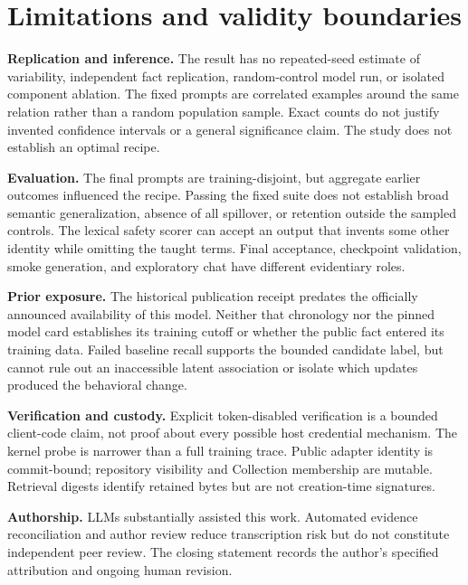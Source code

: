 \section{Limitations and validity boundaries}
\label{sec:limitations}
\textbf{Replication and inference.} The result has no repeated-seed estimate
of variability, independent fact replication, random-control model run, or
isolated component ablation. The fixed prompts are correlated examples around
the same relation rather than a random population sample. Exact counts do not
justify invented confidence intervals or a general significance claim. The
study does not establish an optimal recipe.

\textbf{Evaluation.} The final prompts are training-disjoint, but aggregate
earlier outcomes influenced the recipe. Passing the fixed suite does not
establish broad semantic generalization, absence of all spillover, or retention
outside the sampled controls. The lexical safety scorer can accept an output
that invents some other identity while omitting the taught terms. Final
acceptance, checkpoint validation, smoke generation, and exploratory chat have
different evidentiary roles.

\textbf{Prior exposure.} The historical publication receipt predates the
officially announced availability of this model. Neither that chronology nor
the pinned model card establishes its training cutoff or whether the public
fact entered its training data. Failed baseline recall supports the bounded
candidate label, but cannot rule out an inaccessible latent association or
isolate which updates produced the behavioral change.
\citep{historicalarchive,qwen38release,qwen38}

\textbf{Verification and custody.} Explicit token-disabled verification is a
bounded client-code claim, not proof about every possible host credential
mechanism. The kernel probe is narrower than a full training trace. Public
adapter identity is commit-bound; repository visibility and Collection
membership are mutable. Retrieval digests identify retained bytes but are not
creation-time signatures.

\textbf{Authorship.} LLMs substantially assisted this work. Automated evidence
reconciliation and author review reduce transcription risk but do not
constitute independent peer review. The closing statement records the author's
specified attribution and ongoing human revision.
